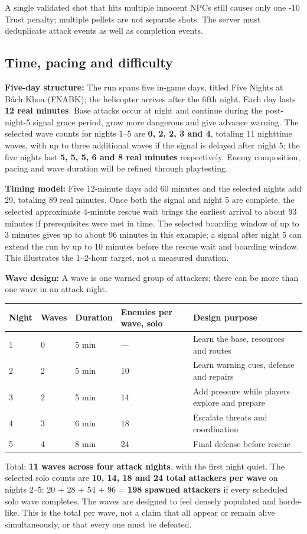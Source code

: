 A single validated shot that hits multiple innocent NPCs still causes only one -10 Trust penalty; multiple pellets are not separate shots. The server must deduplicate attack events as well as completion events.


\subsection{Time, pacing and difficulty}
\textbf{Five-day structure:} The run spans five in-game days, titled Five Nights at Bách Khoa (FNABK); the helicopter arrives after the fifth night. Each day lasts \textbf{12 real minutes}. Base attacks occur at night and continue during the post-night-5 signal grace period, grow more dangerous and give advance warning. The selected wave counts for nights 1--5 are \textbf{0, 2, 2, 3 and 4}, totaling 11 nighttime waves, with up to three additional waves if the signal is delayed after night 5; the five nights last \textbf{5, 5, 5, 6 and 8 real minutes} respectively. Enemy composition, pacing and wave duration will be refined through playtesting.

\textbf{Timing model:} Five 12-minute days add 60 minutes and the selected nights add 29, totaling 89 real minutes. Once both the signal and night 5 are complete, the selected approximate 4-minute rescue wait brings the earliest arrival to about 93 minutes if prerequisites were met in time. The selected boarding window of up to 3 minutes gives up to about 96 minutes in this example; a signal after night 5 can extend the run by up to 10 minutes before the rescue wait and boarding window. This illustrates the 1--2-hour target, not a measured duration.

\textbf{Wave design:} A wave is one warned group of attackers; there can be more than one wave in an attack night.

\begin{longtable}{@{}p{}p{}p{}p{}p{}@{}}
\toprule
\textbf{Night} & \textbf{Waves} & \textbf{Duration} & \textbf{Enemies per wave, solo} & \textbf{Design purpose} \\ \midrule\endhead
1 & 0 & 5 min & --- & Learn the base, resources and routes \\
2 & 2 & 5 min & 10 & Learn warning cues, defense and repairs \\
3 & 2 & 5 min & 14 & Add pressure while players explore and prepare \\
4 & 3 & 6 min & 18 & Escalate threats and coordination \\
5 & 4 & 8 min & 24 & Final defense before rescue \\
\bottomrule
\end{longtable}
Total: \textbf{11 waves across four attack nights}, with the first night quiet. The selected solo counts are \textbf{10, 14, 18 and 24 total attackers per wave} on nights 2--5: 20 + 28 + 54 + 96 = \textbf{198 spawned attackers} if every scheduled solo wave completes. The waves are designed to feel densely populated and horde-like. This is the total per wave, not a claim that all appear or remain alive simultaneously, or that every one must be defeated.

